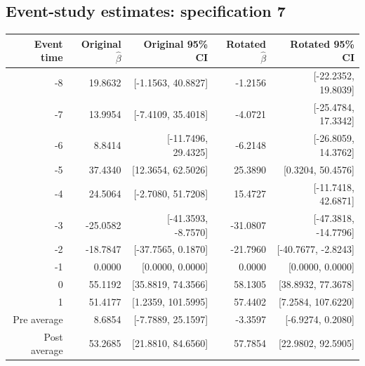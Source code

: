 \documentclass[10pt]{article}
\begin{document}
\subsection*{Event-study estimates: specification 7}
\begin{center}\scriptsize
\begin{tabular}{r rr rr}
\toprule
Event time & Original $\hat\beta$ & Original 95\% CI & Rotated $\hat\beta$ & Rotated 95\% CI \\
\midrule
-8 & 19.8632 & [-1.1563, 40.8827] & -1.2156 & [-22.2352, 19.8039] \\
-7 & 13.9954 & [-7.4109, 35.4018] & -4.0721 & [-25.4784, 17.3342] \\
-6 & 8.8414 & [-11.7496, 29.4325] & -6.2148 & [-26.8059, 14.3762] \\
-5 & 37.4340 & [12.3654, 62.5026] & 25.3890 & [0.3204, 50.4576] \\
-4 & 24.5064 & [-2.7080, 51.7208] & 15.4727 & [-11.7418, 42.6871] \\
-3 & -25.0582 & [-41.3593, -8.7570] & -31.0807 & [-47.3818, -14.7796] \\
-2 & -18.7847 & [-37.7565, 0.1870] & -21.7960 & [-40.7677, -2.8243] \\
-1 & 0.0000 & [0.0000, 0.0000] & 0.0000 & [0.0000, 0.0000] \\
0 & 55.1192 & [35.8819, 74.3566] & 58.1305 & [38.8932, 77.3678] \\
1 & 51.4177 & [1.2359, 101.5995] & 57.4402 & [7.2584, 107.6220] \\
\midrule
Pre average & 8.6854 & [-7.7889, 25.1597] & -3.3597 & [-6.9274, 0.2080] \\
Post average & 53.2685 & [21.8810, 84.6560] & 57.7854 & [22.9802, 92.5905] \\
\bottomrule
\end{tabular}
\end{center}
\clearpage
\end{document}
